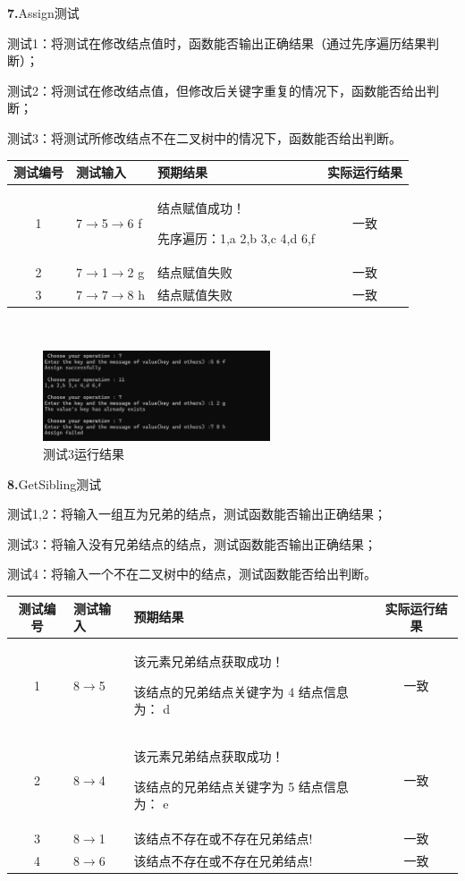 \documentclass[supercite]{Experimental_Report}
\theoremstyle{definition}
\begin{document}
\noindent\textbf{ 7.}Assign测试

测试1：将测试在修改结点值时，函数能否输出正确结果（通过先序遍历结果判断）；

测试2：将测试在修改结点值，但修改后关键字重复的情况下，函数能否给出判断；

测试3：将测试所修改结点不在二叉树中的情况下，函数能否给出判断。

\vspace{0.5em}

\begin{tabular}{|c|l|p{6cm}|c|}
	\hline
	测试编号 & 测试输入 & 预期结果 & 实际运行结果 \\
	\hline
	1 & 7$\rightarrow$5$\rightarrow$6 f & 结点赋值成功！

先序遍历：1,a 2,b 3,c 4,d 6,f & 一致 \\
	\hline
	2 & 7$\rightarrow$1$\rightarrow$2 g & 结点赋值失败 & 一致 \\
	\hline
	3 & 7$\rightarrow$7$\rightarrow$8 h & 结点赋值失败 & 一致 \\
	\hline
\end{tabular}

~\

\begin{figure}[H]
 	\centering
 	\includegraphics[width=0.6\textwidth]{images/二叉树测试7.png}
 	\caption{测试3运行结果}
 	\label{txlab}
 \end{figure}

\noindent\textbf{ 8.}GetSibling测试

测试1,2：将输入一组互为兄弟的结点，测试函数能否输出正确结果；

测试3：将输入没有兄弟结点的结点，测试函数能否输出正确结果；

测试4：将输入一个不在二叉树中的结点，测试函数能否给出判断。

\vspace{0.5em}

\begin{tabular}{|c|l|p{7cm}|c|}
	\hline
	测试编号 & 测试输入 & 预期结果 & 实际运行结果 \\
	\hline
	1 & 8$\rightarrow$5 & 该元素兄弟结点获取成功！

该结点的兄弟结点关键字为 4 结点信息为： d & 一致 \\
	\hline
	2 & 8$\rightarrow$4 & 该元素兄弟结点获取成功！

该结点的兄弟结点关键字为 5 结点信息为： e & 一致 \\
	\hline
	3 & 8$\rightarrow$1 & 该结点不存在或不存在兄弟结点! & 一致 \\
	\hline
	4 & 8$\rightarrow$6 & 该结点不存在或不存在兄弟结点! & 一致 \\
	\hline
\end{tabular}
\end{document}
